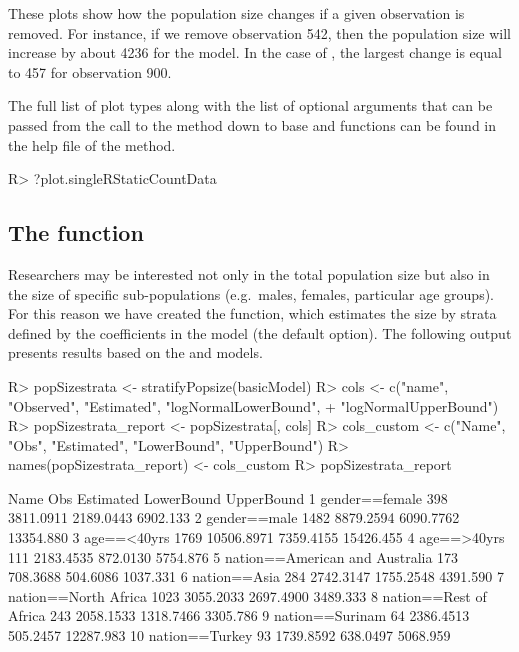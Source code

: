 \documentclass[nojss]{jss}
\newcommand{\1}{\mathcal{I}} \newcommand{\bZero}{\boldsymbol{0}}
\begin{document}
These plots show how the population size changes if a given observation
is removed. For instance, if we remove observation 542, then the
population size will increase by about 4236 for the 
model. In the case of , the largest change is equal to
457 for observation 900.

The full list of plot types along with the list of optional arguments
that can be passed from the call to the  method down to base
 and  functions can be found in the help file
of the  method.

\begin{CodeChunk}
\begin{CodeInput}
R> ?plot.singleRStaticCountData
\end{CodeInput}
\end{CodeChunk}

\subsection[The stratifyPopsize function]{The  function}

Researchers may be interested not only in the total population size but
also in the size of specific sub-populations (e.g.~males, females,
particular age groups). For this reason we have created the
 function, which estimates the size by strata
defined by the coefficients in the model (the default option). The
following output presents results based on the  and
 models.

\begin{CodeChunk}
\begin{CodeInput}
R> popSizestrata <- stratifyPopsize(basicModel)
R> cols <- c("name", "Observed", "Estimated", "logNormalLowerBound",
+           "logNormalUpperBound")
R> popSizestrata_report <- popSizestrata[, cols]
R> cols_custom <- c("Name", "Obs", "Estimated", "LowerBound", "UpperBound")
R> names(popSizestrata_report) <- cols_custom
R> popSizestrata_report
\end{CodeInput}
\begin{CodeOutput}
                             Name  Obs  Estimated LowerBound UpperBound
1                  gender==female  398  3811.0911  2189.0443   6902.133
2                    gender==male 1482  8879.2594  6090.7762  13354.880
3                     age==<40yrs 1769 10506.8971  7359.4155  15426.455
4                     age==>40yrs  111  2183.4535   872.0130   5754.876
5  nation==American and Australia  173   708.3688   504.6086   1037.331
6                    nation==Asia  284  2742.3147  1755.2548   4391.590
7            nation==North Africa 1023  3055.2033  2697.4900   3489.333
8          nation==Rest of Africa  243  2058.1533  1318.7466   3305.786
9                 nation==Surinam   64  2386.4513   505.2457  12287.983
10                 nation==Turkey   93  1739.8592   638.0497   5068.959
\end{CodeOutput}
\end{CodeChunk}
\end{document}
